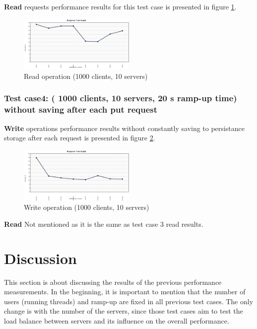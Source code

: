 \documentclass{sig-alternate}
\begin{document}
 \textbf{Read} requests performance results for this test case is presented in figure \ref{get_10_1000}.
 \begin{center}
\begin{figure}[ht!]
\centering
     \includegraphics[width=0.5\textwidth]{get_10_1000_response.png}
\caption{Read operation (1000 clients, 10 servers) \label{get_10_1000}}
\end{figure}
\end{center}
\subsubsection{Test case4: ( 1000 clients, 10 servers, 20 s ramp-up time) without saving after each put request}
 \textbf{Write} operations performance results without constantly saving to persistance storage after each request is presented in figure \ref{put_10_1000_nosave}.
 \begin{center}
\begin{figure}[ht!]
\centering
     \includegraphics[width=0.5\textwidth]{put_10_1000_response_nosave.png}
\caption{Write operation (1000 clients, 10 servers) \label{put_10_1000_nosave}}
\end{figure}
\end{center}

 \textbf{Read}
Not mentioned as it is the same as test case 3 read results. 
\section{Discussion}
This section is about discussing the results of the previous performance measurements. In the beginning, it is important to mention that the number of users (running threads) and ramp-up are fixed in all previous test cases. The only change is with the number of the servers, since those test cases aim to test the load balance between servers and its influence on the overall performance.
\end{document}
